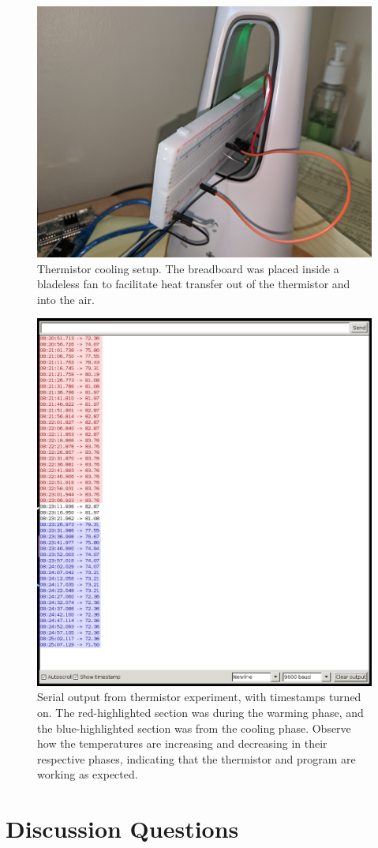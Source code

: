 \documentclass[12pt]{article}
\begin{document}
\begin{figure}[H]
    \centering
    \includegraphics[width=0.7\linewidth]{cooling.jpg}
    \caption{Thermistor cooling setup. The breadboard was placed inside a bladeless
    fan to facilitate heat transfer out of the thermistor and into the air.}
    \label{fig:cooling}
\end{figure}

\begin{figure}[H]
    \centering
    \includegraphics[width=0.6\linewidth]{temp.png}
    \caption{Serial output from thermistor experiment, with timestamps turned on. The 
    red-highlighted section was during the warming phase, and the blue-highlighted section
    was from the cooling phase. Observe how the temperatures are increasing and decreasing 
    in their respective phases, indicating that the thermistor and program are working 
    as expected.}
    \label{fig:tempser}
\end{figure}

\section*{Discussion Questions}
\end{document}

